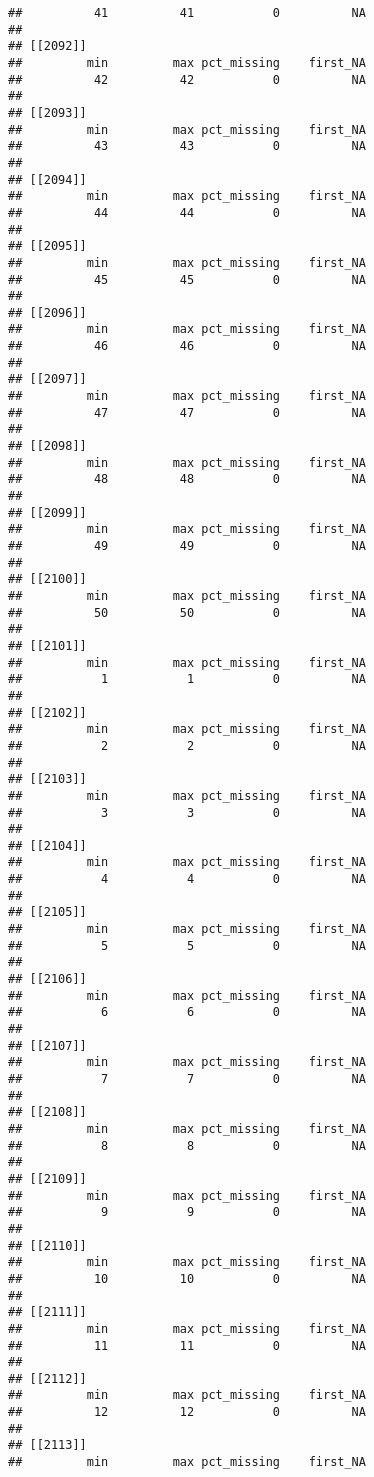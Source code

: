 \documentclass[
]{article}
\begin{document}
\begin{verbatim}
##          41          41           0          NA 
## 
## [[2092]]
##         min         max pct_missing    first_NA 
##          42          42           0          NA 
## 
## [[2093]]
##         min         max pct_missing    first_NA 
##          43          43           0          NA 
## 
## [[2094]]
##         min         max pct_missing    first_NA 
##          44          44           0          NA 
## 
## [[2095]]
##         min         max pct_missing    first_NA 
##          45          45           0          NA 
## 
## [[2096]]
##         min         max pct_missing    first_NA 
##          46          46           0          NA 
## 
## [[2097]]
##         min         max pct_missing    first_NA 
##          47          47           0          NA 
## 
## [[2098]]
##         min         max pct_missing    first_NA 
##          48          48           0          NA 
## 
## [[2099]]
##         min         max pct_missing    first_NA 
##          49          49           0          NA 
## 
## [[2100]]
##         min         max pct_missing    first_NA 
##          50          50           0          NA 
## 
## [[2101]]
##         min         max pct_missing    first_NA 
##           1           1           0          NA 
## 
## [[2102]]
##         min         max pct_missing    first_NA 
##           2           2           0          NA 
## 
## [[2103]]
##         min         max pct_missing    first_NA 
##           3           3           0          NA 
## 
## [[2104]]
##         min         max pct_missing    first_NA 
##           4           4           0          NA 
## 
## [[2105]]
##         min         max pct_missing    first_NA 
##           5           5           0          NA 
## 
## [[2106]]
##         min         max pct_missing    first_NA 
##           6           6           0          NA 
## 
## [[2107]]
##         min         max pct_missing    first_NA 
##           7           7           0          NA 
## 
## [[2108]]
##         min         max pct_missing    first_NA 
##           8           8           0          NA 
## 
## [[2109]]
##         min         max pct_missing    first_NA 
##           9           9           0          NA 
## 
## [[2110]]
##         min         max pct_missing    first_NA 
##          10          10           0          NA 
## 
## [[2111]]
##         min         max pct_missing    first_NA 
##          11          11           0          NA 
## 
## [[2112]]
##         min         max pct_missing    first_NA 
##          12          12           0          NA 
## 
## [[2113]]
##         min         max pct_missing    first_NA 

\end{verbatim}
\end{document}
